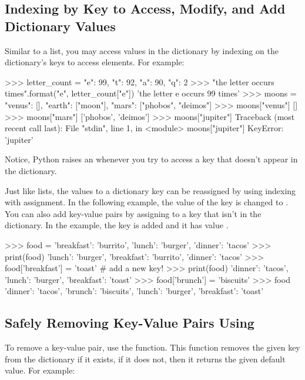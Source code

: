 \documentclass[11pt]{cselabheader}
\begin{document}
\subsection{Indexing by Key to Access, Modify, and Add Dictionary Values}

Similar to a list, you may access values in the dictionary by
indexing on the dictionary's keys to access elements.
For example:

\begin{pyconcode}
>>> letter_count = {"e": 99, "t": 92, "a": 90, "q": 2}
>>> "the letter {} occurs {} times".format("e", letter_count["e"])
'the letter e occurs 99 times'
>>> moons = {"venus": [], "earth": ["moon"], "mars": ["phobos", "deimos"]}
>>> moons["venus"]
[]
>>> moons["mars"]
['phobos', 'deimos']
>>> moons["jupiter"]
Traceback (most recent call last):
  File "stdin", line 1, in <module>
    moons["jupiter"]
KeyError: 'jupiter'

\end{pyconcode}

Notice, Python raises an  whenever you try to access a
key that doesn't appear in the dictionary.

Just like lists, the values to a dictionary key can be reassigned by using
indexing with assignment. In the following example, the value of the key
 is changed to .
You can also add key-value pairs by assigning to a key that isn't in the
dictionary. In the example, the key  is added and it
has value .

\begin{pyconcode}
>>> food = {'breakfast': 'burrito', 'lunch': 'burger', 'dinner': 'tacos'}
>>> print(food)
{'lunch': 'burger', 'breakfast': 'burrito', 'dinner': 'tacos'}
>>> food['breakfast'] = 'toast'  # add a new key!
>>> print(food)
{'dinner': 'tacos', 'lunch': 'burger', 'breakfast': 'toast'}
>>> food['brunch'] = 'biscuits'
>>> food
{'dinner': 'tacos', 'brunch': 'biscuits', 'lunch': 'burger', 'breakfast': 'toast'}

\end{pyconcode}


\subsection{Safely Removing Key-Value Pairs Using }

To remove a key-value pair, use the 
function. This function removes the given key from the dictionary if it exists,
if it does not, then it returns the given default value.
For example:
\end{document}
